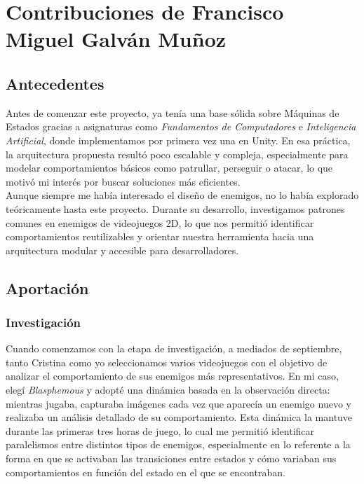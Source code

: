 \section*{Contribuciones de Francisco Miguel Galván Muñoz}
\subsection*{Antecedentes}
Antes de comenzar este proyecto, ya tenía una base sólida sobre Máquinas de Estados gracias a asignaturas como \textit{Fundamentos de Computadores} e \textit{Inteligencia Artificial}, donde implementamos por primera vez una en Unity. En esa práctica, la arquitectura propuesta resultó poco escalable y compleja, especialmente para modelar comportamientos básicos como patrullar, perseguir o atacar, lo que motivó mi interés por buscar soluciones más eficientes.\\

Aunque siempre me había interesado el diseño de enemigos, no lo había explorado teóricamente hasta este proyecto. Durante su desarrollo, investigamos patrones comunes en enemigos de videojuegos 2D, lo que nos permitió identificar comportamientos reutilizables y orientar nuestra herramienta hacia una arquitectura modular y accesible para desarrolladores.\\
 
\subsection*{Aportación}
\subsubsection*{Investigación}
Cuando comenzamos con la etapa de investigación, a mediados de septiembre, tanto Cristina como yo seleccionamos varios videojuegos con el objetivo de analizar el comportamiento de sus enemigos más representativos. En mi caso, elegí \textit{Blasphemous} y adopté una dinámica basada en la observación directa: mientras jugaba, capturaba imágenes cada vez que aparecía un enemigo nuevo y realizaba un análisis detallado de su comportamiento. Esta dinámica la mantuve durante las primeras tres horas de juego, lo cual me permitió identificar paralelismos entre distintos tipos de enemigos, especialmente en lo referente a la forma en que se activaban las transiciones entre estados y cómo variaban sus comportamientos en función del estado en el que se encontraban.\\

